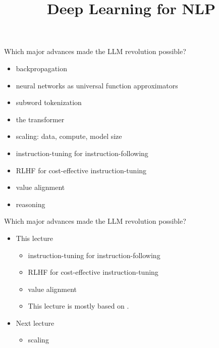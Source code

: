 \documentclass[11pt,compress,t,notes=noshow, xcolor=table]{beamer}
\title{Deep Learning for NLP}
\begin{document}







\begin{vbframe}{Which major advances made the LLM revolution possible?}

\vfill

	\begin{itemize}
        \item backpropagation
		\item neural networks as universal function approximators
		\item subword tokenization
		\item the transformer
\item scaling: data, compute, model size
\item instruction-tuning for instruction-following
\item RLHF for cost-effective instruction-tuning
\item value alignment
\item reasoning
	\end{itemize}

\vfill

\end{vbframe}
\begin{vbframe}{Which major advances made the LLM revolution possible?}


\vfill

	\begin{itemize}
        \item This lecture
	\begin{itemize}
\item instruction-tuning for instruction-following
\item RLHF for cost-effective instruction-tuning
\item value alignment
\item This lecture is mostly based on
\href{https://arxiv.org/abs/2203.02155}{}.
	\end{itemize}
        \item Next lecture
	\begin{itemize}
\item scaling
	\end{itemize}
	\end{itemize}

\vfill

\end{vbframe}
\end{document}
